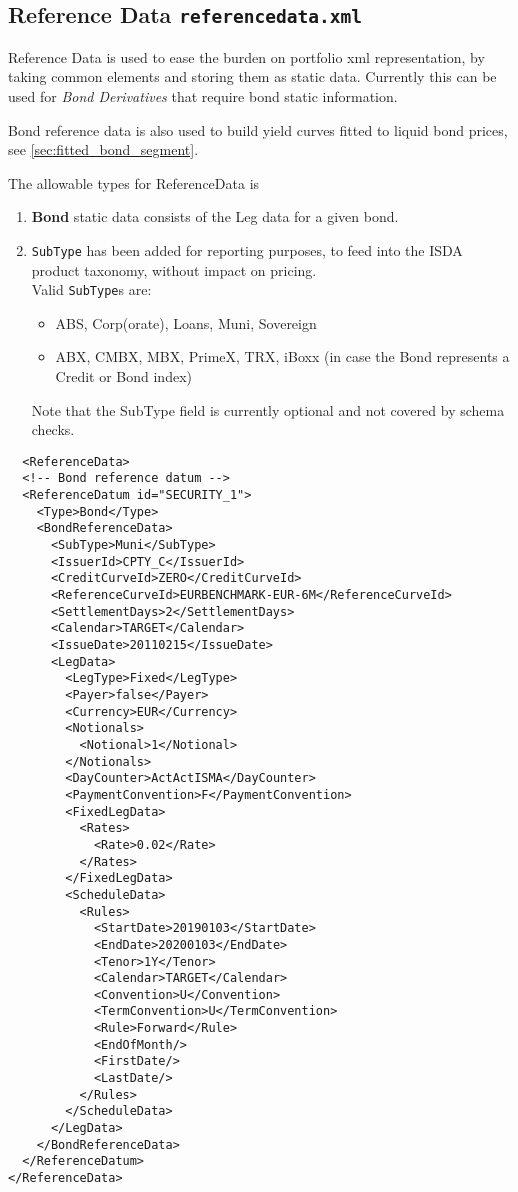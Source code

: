 \subsection{Reference Data {\tt referencedata.xml}}
\label{sec:referencedata}

Reference Data is used to ease the burden on portfolio xml representation, by taking common elements and storing them as
static data. Currently this can be used for \textit{Bond Derivatives} that require bond static information.

Bond reference data is also used to build yield curves fitted to liquid bond prices, see \ref{sec:fitted_bond_segment}.

The allowable types for ReferenceData is
\begin{enumerate}
\item \textbf{Bond} static data consists of the Leg data for a given bond.
\item \texttt{SubType} has been added for reporting purposes, to feed into the ISDA product taxonomy, without impact on pricing. \\
  Valid \texttt{SubType}s are: \\
  \begin{itemize}
    \item ABS, Corp(orate), Loans, Muni, Sovereign 
    \item ABX, CMBX, MBX, PrimeX, TRX, iBoxx (in case the Bond represents a Credit or Bond index)
  \end{itemize}
  Note that the SubType field is currently optional and not covered by schema checks.
\end{enumerate}

\begin{verbatim}
  <ReferenceData>
  <!-- Bond reference datum -->
  <ReferenceDatum id="SECURITY_1">
    <Type>Bond</Type>
    <BondReferenceData>
      <SubType>Muni</SubType>
      <IssuerId>CPTY_C</IssuerId>
      <CreditCurveId>ZERO</CreditCurveId>
      <ReferenceCurveId>EURBENCHMARK-EUR-6M</ReferenceCurveId>
      <SettlementDays>2</SettlementDays>
      <Calendar>TARGET</Calendar>
      <IssueDate>20110215</IssueDate>
      <LegData>
        <LegType>Fixed</LegType>
        <Payer>false</Payer>
        <Currency>EUR</Currency>
        <Notionals>
          <Notional>1</Notional>
        </Notionals>
        <DayCounter>ActActISMA</DayCounter>
        <PaymentConvention>F</PaymentConvention>
        <FixedLegData>
          <Rates>
            <Rate>0.02</Rate>
          </Rates>
        </FixedLegData>
        <ScheduleData>
          <Rules>
            <StartDate>20190103</StartDate>
            <EndDate>20200103</EndDate>
            <Tenor>1Y</Tenor>
            <Calendar>TARGET</Calendar>
            <Convention>U</Convention>
            <TermConvention>U</TermConvention>
            <Rule>Forward</Rule>
            <EndOfMonth/>
            <FirstDate/>
            <LastDate/>
          </Rules>
        </ScheduleData>
      </LegData>
    </BondReferenceData>
  </ReferenceDatum>
</ReferenceData>
\end{verbatim}
